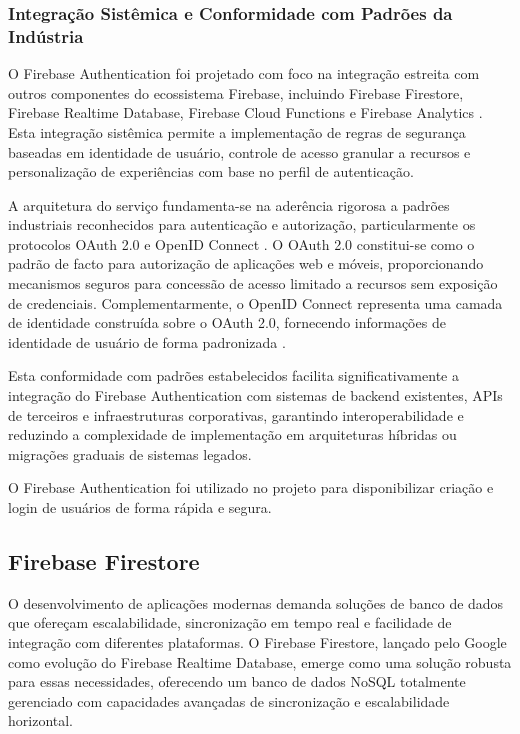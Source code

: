 \subsubsection{Integração Sistêmica e Conformidade com Padrões da Indústria}

O Firebase Authentication foi projetado com foco na integração estreita com outros componentes do ecossistema Firebase, incluindo Firebase Firestore, Firebase Realtime Database, Firebase Cloud Functions e Firebase Analytics \cite{firebase2023ecosystem}. Esta integração sistêmica permite a implementação de regras de segurança baseadas em identidade de usuário, controle de acesso granular a recursos e personalização de experiências com base no perfil de autenticação.

A arquitetura do serviço fundamenta-se na aderência rigorosa a padrões industriais reconhecidos para autenticação e autorização, particularmente os protocolos OAuth 2.0 e OpenID Connect \cite{auth0oauth}. O OAuth 2.0 constitui-se como o padrão de facto para autorização de aplicações web e móveis, proporcionando mecanismos seguros para concessão de acesso limitado a recursos sem exposição de credenciais. Complementarmente, o OpenID Connect representa uma camada de identidade construída sobre o OAuth 2.0, fornecendo informações de identidade de usuário de forma padronizada \cite{openidconnect}.

Esta conformidade com padrões estabelecidos facilita significativamente a integração do Firebase Authentication com sistemas de backend existentes, APIs de terceiros e infraestruturas corporativas, garantindo interoperabilidade e reduzindo a complexidade de implementação em arquiteturas híbridas ou migrações graduais de sistemas legados.

O Firebase Authentication foi utilizado no projeto para disponibilizar criação e login de usuários de forma rápida e segura.


\subsection{Firebase Firestore}

O desenvolvimento de aplicações modernas demanda soluções de banco de dados que ofereçam escalabilidade, sincronização em tempo real e facilidade de integração com diferentes plataformas. O Firebase Firestore, lançado pelo Google como evolução do Firebase Realtime Database, emerge como uma solução robusta para essas necessidades, oferecendo um banco de dados NoSQL totalmente gerenciado com capacidades avançadas de sincronização e escalabilidade horizontal.

